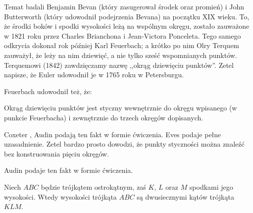 Temat badali Benjamin Bevan (który zasugerował środek oraz promień) i John Butterworth (który udowodnił podejrzenia Bevana) na początku XIX wieku.
%
%
To, że środki boków i spodki wysokości leżą na wspólnym okręgu, zostało zauważone w 1821 roku przez Charles Brianchona i Jean-Victora Ponceleta.
%
%
Tego samego odkrycia dokonał rok później Karl Feuerbach; a krótko po nim Olry Terquem zauważył, że leży na nim dziewięć, a nie tylko sześć wspomnianych punktów.
%
%
Terquemowi (1842) zawdzięczamy nazwę ,,okrąg dziewięciu punktów''.
Zetel napisze, że Euler udowodnił je w 1765 roku w Petersburgu.

Feuerbach udowodnił też, że:

\begin{theorem}[Feuerbacha]
\label{punkt_feuerbacha}%
	Okrąg dziewięciu punktów jest styczny wewnętrznie do okręgu wpisanego (w punkcie Feuerbacha) i zewnętrznie do trzech okręgów dopisanych.
\end{theorem}

Coxeter \cite[s. 99]{coxeter_1967}, Audin \cite[s. 110]{audin_2003} podają ten fakt w formie ćwiczenia.
Eves \cite[s. 133]{eves1_1972} podaje pełne uzasadnienie.
Zetel \cite[s. 70]{zetel_2020} bardzo prosto dowodzi, że punkty styczności można znaleźć bez konstruowania pięciu okręgów.

Audin \cite[s. 105]{audin_2003} podaje ten fakt w formie ćwiczenia.

\begin{proposition}
	\label{orthic_triangle}
	Niech $ABC$ będzie trójkątem ostrokątnym, zaś $K$, $L$ oraz $M$ spodkami jego wysokości.
	Wtedy wysokości trójkąta $ABC$ są dwusiecznymi kątów trójkąta $KLM$.
\end{proposition}

